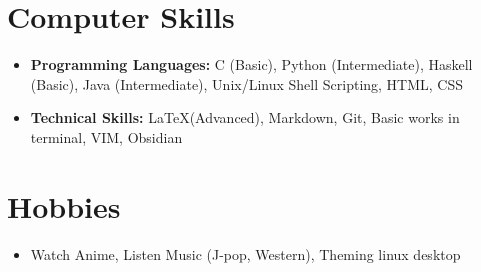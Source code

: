 \documentclass[10pt,a4paper,sans,colorlinks]{moderncv}        %
\begin{document}
\section{Computer Skills}

\begin{itemize}

	\item \textbf{Programming Languages:} C (Basic), Python (Intermediate), Haskell (Basic), Java (Intermediate), Unix/Linux Shell Scripting, HTML, CSS

	\item \textbf{Technical Skills:} \LaTeX (Advanced), Markdown, Git, Basic works in terminal, VIM, Obsidian


\end{itemize}
\section{Hobbies}

\begin{itemize}

	\item  Watch Anime, Listen Music (J-pop, Western), Theming linux desktop


\end{itemize}
%	


\end{document}
